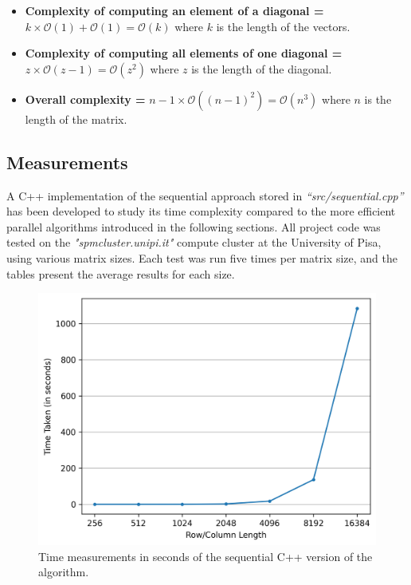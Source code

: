 \begin{itemize}
    \item \textbf{Complexity of computing an element of a diagonal = } $k \times \mathcal{O}(1) + \mathcal{O}(1) = \mathcal{O}(k)$ where $k$ is the length of the vectors. 

    \item \textbf{Complexity of computing all elements of one diagonal =} $z \times \mathcal{O}(z-1) = \mathcal{O}(z^{2})$ where $z$ is the length of the diagonal.

    \item \textbf{Overall complexity = } $n-1 \times \mathcal{O}((n-1)^{2}) = \mathcal{O}(n^{3})$ where $n$ is the length of the matrix.
\end{itemize}

\subsection*{Measurements}
A C++ implementation of the sequential approach stored in \textit{``src/sequential.cpp''} has been developed to study its time complexity compared to the more efficient parallel algorithms introduced in the following sections. All project code was tested on the \textit{"spmcluster.unipi.it"} compute cluster at the University of Pisa, using various matrix sizes. Each test was run five times per matrix size, and the tables present the average results for each size.

\begin{figure}[h]
    \centering\includegraphics[scale=0.50]{img/Sequential Implementation/sequential_graph.png}
    \caption{Time measurements in seconds of the sequential C++ version of the algorithm.}
\end{figure}

